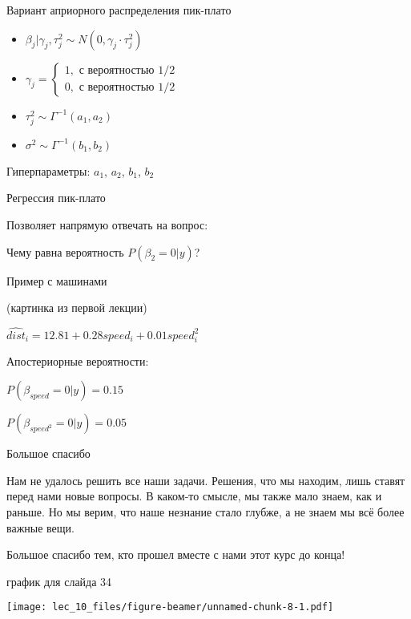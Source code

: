\documentclass[ignorenonframetext,]{beamer}
\begin{document}
\begin{frame}{Вариант априорного распределения пик-плато}

\begin{itemize}
\item
  \(\beta_j | \gamma_j, \tau^2_j \sim N(0, \gamma_j \cdot \tau^2_j )\)
\item
  \(\gamma_j = \begin{cases} 1, \text{ с вероятностью } 1/2 \\ 0, \text{ с вероятностью } 1/2 \end{cases}\)
\item
  \(\tau_j^2 \sim \Gamma^{-1}(a_1,a_2)\)
\item
  \(\sigma^2 \sim \Gamma^{-1}(b_1,b_2)\)
\end{itemize}

Гиперпараметры: \(a_1\), \(a_2\), \(b_1\), \(b_2\)

\end{frame}

\begin{frame}{Регрессия пик-плато}

Позволяет напрямую отвечать на вопрос:

Чему равна вероятность \(P(\beta_2 = 0 | y)\)?

\end{frame}

\begin{frame}{Пример с машинами}

(картинка из первой лекции)

\(\widehat{dist}_i = 12.81 + 0.28 speed_i + 0.01 speed_i^2\)

Апостериорные вероятности:

\(P(\beta_{speed}=0 | y )=0.15\)

\(P(\beta_{speed^2}=0 | y )=0.05\)

\end{frame}

\begin{frame}{Большое спасибо}

Нам не удалось решить все наши задачи. Решения, что мы находим, лишь
ставят перед нами новые вопросы. В каком-то смысле, мы также мало знаем,
как и раньше. Но мы верим, что наше незнание стало глубже, а не знаем мы
всё более важные вещи.

Большое спасибо тем, кто прошел вместе с нами этот курс до конца!

\end{frame}

\begin{frame}{график для слайда 34}

\texttt{[image: lec\_10\_files/figure-beamer/unnamed-chunk-8-1.pdf]}

\end{frame}
\end{document}
